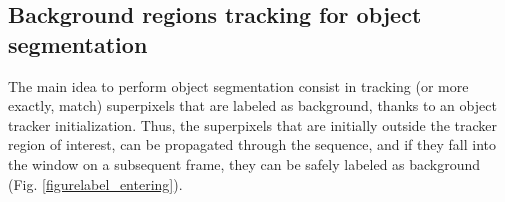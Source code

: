 \subsection{Background regions tracking for object segmentation}
\label{sec:segm}
 
The main idea to perform object segmentation consist in tracking (or more exactly, match) superpixels that are labeled as background, thanks to an object tracker initialization. Thus, the superpixels that are initially outside the tracker region of interest, 
can be propagated through the sequence, and if they fall into the window on a subsequent frame, they
can be safely labeled as background (Fig.  \ref{figurelabel_entering}). \\

